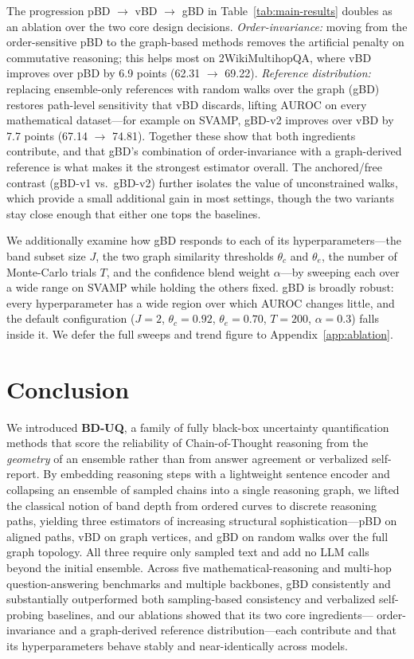 \documentclass[letterpaper]{article} %
\begin{document}
The progression pBD $\rightarrow$ vBD $\rightarrow$ gBD in
Table~\ref{tab:main-results} doubles as an ablation over the two core design
decisions. \emph{Order-invariance:} moving from the order-sensitive pBD to the
graph-based methods removes the artificial penalty on commutative reasoning;
this helps most on 2WikiMultihopQA, where vBD improves over pBD by 6.9 points
(62.31 $\rightarrow$ 69.22). \emph{Reference distribution:} replacing
ensemble-only references with random walks over the graph (gBD) restores
path-level sensitivity that vBD discards, lifting AUROC on every mathematical
dataset---for example on SVAMP, gBD-v2 improves over vBD by 7.7 points
(67.14 $\rightarrow$ 74.81). Together these show that both ingredients
contribute, and that gBD's combination of order-invariance with a graph-derived
reference is what makes it the strongest estimator overall. The anchored/free
contrast (gBD-v1 vs.\ gBD-v2) further isolates the value of unconstrained walks,
which provide a small additional gain in most settings, though the two variants
stay close enough that either one tops the baselines.

We additionally examine how gBD responds to each of its hyperparameters---the band
subset size $J$, the two graph similarity thresholds $\theta_c$ and $\theta_e$, the
number of Monte-Carlo trials $T$, and the confidence blend weight $\alpha$---by
sweeping each over a wide range on SVAMP while holding the others fixed. gBD is
broadly robust: every hyperparameter has a wide region over which AUROC changes
little, and the default configuration ($J{=}2$, $\theta_c{=}0.92$, $\theta_e{=}0.70$,
$T{=}200$, $\alpha{=}0.3$) falls inside it. We defer the full sweeps and trend figure
to Appendix~\ref{app:ablation}.

\section{Conclusion}
\label{sec:conclusion}

We introduced \textbf{BD-UQ}, a family of fully black-box uncertainty
quantification methods that score the reliability of Chain-of-Thought reasoning
from the \emph{geometry} of an ensemble rather than from answer agreement or
verbalized self-report. By embedding reasoning steps with a lightweight sentence
encoder and collapsing an ensemble of sampled chains into a single reasoning
graph, we lifted the classical notion of band depth from ordered curves to
discrete reasoning paths, yielding three estimators of increasing structural
sophistication---pBD on aligned paths, vBD on graph vertices, and gBD on random
walks over the full graph topology. All three require only sampled text and add
no LLM calls beyond the initial ensemble. Across five mathematical-reasoning and
multi-hop question-answering benchmarks and multiple backbones, gBD consistently
and substantially outperformed both sampling-based consistency and verbalized
self-probing baselines, and our ablations showed that its two core ingredients---
order-invariance and a graph-derived reference distribution---each contribute and
that its hyperparameters behave stably and near-identically across models.
\end{document}
